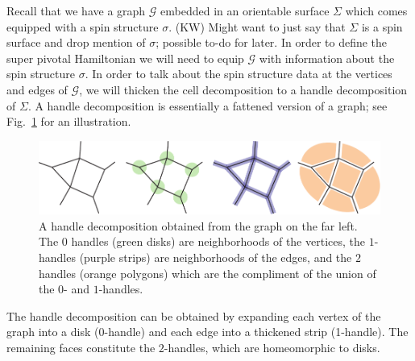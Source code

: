 \documentclass[12pt,a4paper]{article}
\newcommand{\mcg}{\mathcal{G}}
\newcommand{\kw}[1]{{\color{kwcolor}\footnotesize{(KW) #1}}}
\begin{document}
Recall that we have a graph $\mcg$ embedded in an orientable surface $\Sigma$ which comes equipped with a spin structure $\sigma$.
\kw{Might want to just say that $\Sigma$ is a spin surface and drop mention of $\sigma$; possible to-do for later.}
In order to define the super pivotal Hamiltonian we will need to equip $\mcg$ with information about the spin structure $\sigma$. 
In order to talk about the spin structure data at the vertices and edges of $\mcg$, we will thicken the cell decomposition to a handle decomposition of $\Sigma$.
A handle decomposition is essentially a fattened version of a graph; see Fig.~\ref{HandleDecomposition} for an illustration.
\begin{figure}
  \includegraphics{HandleDecomposition.pdf}
  \caption{A handle decomposition obtained from the graph on the far left.
  The $0$ handles (green disks) are neighborhoods of the vertices, the $1$-handles (purple strips) are neighborhoods of the edges, and the $2$ handles (orange polygons) which are the compliment of the union of the $0$- and $1$-handles.}
  \label{HandleDecomposition}
\end{figure}
The handle decomposition can be obtained by expanding each vertex of the graph into a disk ($0$-handle) and each edge into
a thickened strip (1-handle).
The remaining faces constitute the $2$-handles, which are homeomorphic to disks.
\end{document}

